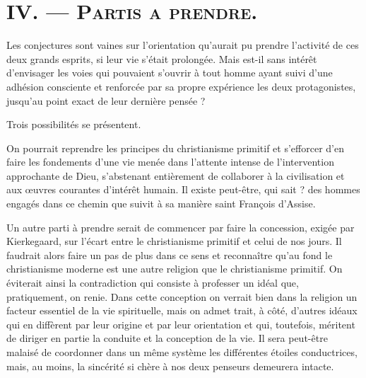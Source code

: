 \documentclass[12pt,a4paper]{article}
\newcommand{\opage}[1]{\marginnote{\footnotesize\textit{[#1]}}}
\begin{document}
\section*{IV. --- \textsc{Partis a prendre.}}

Les conjectures sont vaines sur l'orientation qu'aurait pu prendre
l'activité de ces deux grands esprits, si leur vie s'était prolongée.
Mais est-il sans intérêt d'envisager les voies qui pouvaient s'ouvrir
à tout homme ayant suivi d'une adhésion consciente et renforcée
par sa propre expérience les deux protagonistes, jusqu'au point
exact de leur dernière pensée ?

Trois possibilités se présentent.

On pourrait reprendre les principes du christianisme primitif et
s'efforcer d'en faire les fondements d'une vie menée dans l'attente
intense de l'intervention approchante de Dieu, s'abstenant entièrement
de collaborer à la civilisation et aux œuvres courantes d'intérêt
humain. Il existe peut-être, qui sait ? des hommes engagés dans
ce chemin que suivit à sa manière saint François d'Assise.

Un autre parti à prendre serait de commencer par faire la concession,
exigée par Kierkegaard, sur l'écart entre le christianisme
primitif et celui de nos jours. Il faudrait alors faire un pas de plus
dans ce sens et reconnaître qu'au fond le christianisme moderne
est une autre religion que le christianisme primitif. On éviterait
ainsi la contradiction qui consiste à professer un idéal que, pratiquement,
on renie. Dans cette conception on verrait bien dans la
religion un facteur essentiel de la vie spirituelle, mais on admet%
\opage{243}trait, à côté, d'autres idéaux qui en diffèrent par leur origine et par
leur orientation et qui, toutefois, méritent de diriger en partie la
conduite et la conception de la vie. Il sera peut-être malaisé de
coordonner dans un même système les différentes étoiles conductrices,
mais, au moins, la sincérité si chère à nos deux penseurs
demeurera intacte.
\end{document}

